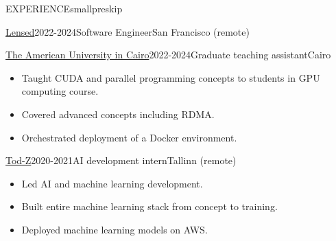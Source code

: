 \documentclass{resume}
\begin{document}
\begin{minipage}[t]{0.54\textwidth}
\begin{rsection}{\MakeUppercase{experience}}{smallpreskip}
\begin{rcontent}[90pt]{\href{https://lenseda.com/}{Lensed}}{2022-2024}{Software Engineer}{San Francisco (remote)}
\begin{itemize}
		\end{itemize}
		\end{rcontent}
		\divider
		\begin{rcontent}[90pt]{\href{https://www.aucegypt.edu/}{The American University in Cairo}}{2022-2024}{Graduate teaching assistant}{Cairo}
			\begin{itemize}
				\item Taught CUDA and parallel programming concepts to students in GPU computing course.
				\item Covered advanced concepts including RDMA.
				                \item Orchestrated deployment of a Docker environment.
			\end{itemize}
		\end{rcontent}
		\divider
		\begin{rcontent}[90pt]{\href{https://www.tod-z.com/}{Tod-Z}}{2020-2021}{AI development intern}{Tallinn (remote)}
			\begin{itemize}
				\item Led AI and machine learning development.
				\item Built entire machine learning stack from concept to training.
				\item Deployed machine learning models on AWS.
			\end{itemize}

\end{rcontent}
\end{rsection}
\end{minipage}
\end{document}
